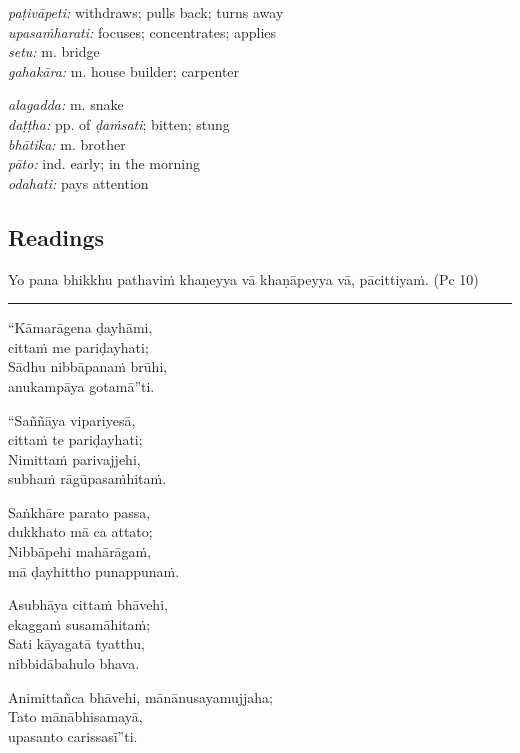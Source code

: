 \documentclass[11pt,oneside]{memoir}
\begin{document}
\bigskip

\begin{twocols}
\emph{paṭivāpeti:} withdraws; pulls back; turns away\\[0pt]
\emph{upasaṁharati:} focuses; concentrates; applies\\[0pt]
\emph{setu:} m. bridge\\[0pt]
\emph{gahakāra:} m. house builder; carpenter

\columnbreak

\emph{alagadda:} m. snake\\[0pt]
\emph{daṭṭha:} pp. of \emph{ḍaṁsati}; bitten; stung\\[0pt]
\emph{bhātika:} m. brother\\[0pt]
\emph{pāto:} ind. early; in the morning\\[0pt]
\emph{odahati:} pays attention
\end{twocols}

\clearpage

\subsection{Readings}
\label{sec:orgc7a4018}

Yo pana bhikkhu pathaviṁ khaṇeyya vā khaṇāpeyya vā, pācittiyaṁ. (Pc 10)

\noindent\rule{\textwidth}{0.5pt}

“Kāmarāgena ḍayhāmi,\\[0pt]
cittaṁ me pariḍayhati;\\[0pt]
Sādhu nibbāpanaṁ brūhi,\\[0pt]
anukampāya gotamā”ti.

“Saññāya vipariyesā,\\[0pt]
cittaṁ te pariḍayhati;\\[0pt]
Nimittaṁ parivajjehi,\\[0pt]
subhaṁ rāgūpasaṁhitaṁ.

Saṅkhāre parato passa,\\[0pt]
dukkhato mā ca attato;\\[0pt]
Nibbāpehi mahārāgaṁ,\\[0pt]
mā ḍayhittho punappunaṁ.

Asubhāya cittaṁ bhāvehi,\\[0pt]
ekaggaṁ susamāhitaṁ;\\[0pt]
Sati kāyagatā tyatthu,\\[0pt]
nibbidābahulo bhava.

Animittañca bhāvehi,
mānānusayamujjaha;\\[0pt]
Tato mānābhisamayā,\\[0pt]
upasanto carissasī”ti.
\end{document}
